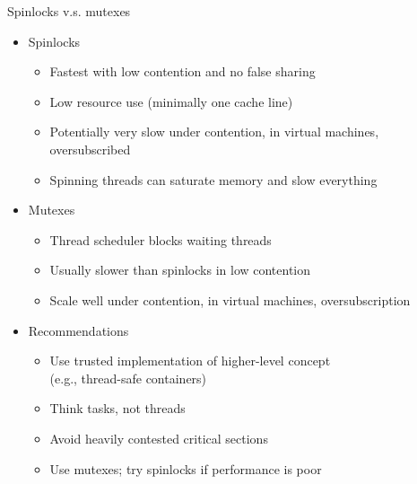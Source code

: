 \begin{frame}{Spinlocks v.s. mutexes}

  \begin{itemize}
  \item Spinlocks
    \begin{itemize}
    \item Fastest with low contention and no false sharing
    \item Low resource use (minimally one cache line)
    \item Potentially very slow under contention, in virtual machines, oversubscribed
    \item Spinning threads can saturate memory and slow everything
    \end{itemize}
  \item Mutexes
    \begin{itemize}
    \item Thread scheduler blocks waiting threads
    \item Usually slower than spinlocks in low contention 
    \item Scale well under contention, in virtual machines, oversubscription
    \end{itemize}
  \item Recommendations
    \begin{itemize}
    \item Use trusted implementation of higher-level concept\\
          (e.g., thread-safe containers)
    \item Think tasks, not threads
    \item Avoid heavily contested critical sections
    \item Use mutexes; try spinlocks if performance is poor
    \end{itemize}
\end{itemize}
\end{frame}

